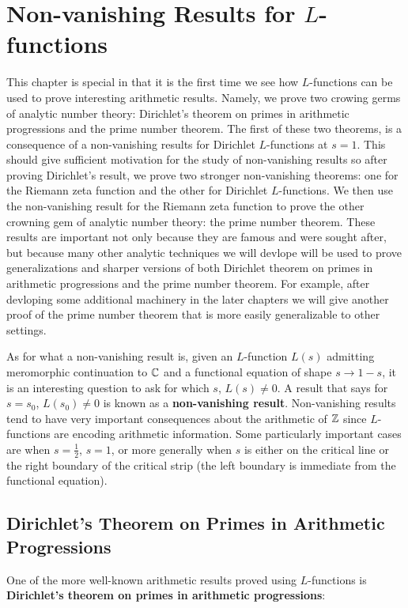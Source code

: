 \chapter{Non-vanishing Results for \texorpdfstring{$L$}{L}-functions}\label{ch:Selected_topics_in_L-functions}
  This chapter is special in that it is the first time we see how $L$-functions can be used to prove interesting arithmetic results. Namely, we prove two crowing germs of analytic number theory: Dirichlet's theorem on primes in arithmetic progressions and the prime number theorem. The first of these two theorems, is a consequence of a non-vanishing results for Dirichlet $L$-functions at $s = 1$. This should give sufficient motivation for the study of non-vanishing results so after proving Dirichlet's result, we prove two stronger non-vanishing theorems: one for the Riemann zeta function and the other for Dirichlet $L$-functions. We then use the non-vanishing result for the Riemann zeta function to prove the other crowning gem of analytic number theory: the prime number theorem. These results are important not only because they are famous and were sought after, but because many other analytic techniques we will devlope will be used to prove generalizations and sharper versions of both Dirichlet theorem on primes in arithmetic progressions and the prime number theorem. For example, after devloping some additional machinery in the later chapters we will give another proof of the prime number theorem that is more easily generalizable to other settings.

  As for what a non-vanishing result is, given an $L$-function $L(s)$ admitting meromorphic continuation to $\mathbb{C}$ and a functional equation of shape $s \to 1-s$, it is an interesting question to ask for which $s$, $L(s) \neq 0$. A result that says for $s = s_{0}$, $L(s_{0}) \neq 0$ is known as a \textbf{non-vanishing result}. Non-vanishing results tend to have very important consequences about the arithmetic of $\mathbb{Z}$ since $L$-functions are encoding arithmetic information. Some particularly important cases are when $s = \frac{1}{2}$, $s = 1$, or more generally when $s$ is either on the critical line or the right boundary of the critical strip (the left boundary is immediate from the functional equation).
    \section{Dirichlet's Theorem on Primes in Arithmetic Progressions}
      One of the more well-known arithmetic results proved using $L$-functions is \textbf{Dirichlet's theorem on primes in arithmetic progressions}:

